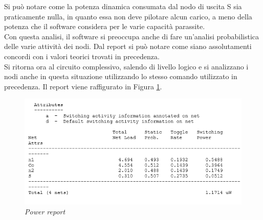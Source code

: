 Si può notare come la potenza dinamica consumata dal nodo di uscita S sia praticamente nulla, in quanto essa non deve pilotare alcun carico, a meno della potenza che il software considera per le varie capacità parassite. \\
Con questa analisi, il software si preoccupa anche di fare un'analisi probabilistica delle varie attività dei nodi. Dal report si può notare come siano assolutamenti concordi con i valori teorici trovati in precedenza.\\
Si ritorna ora al circuito complessivo, salendo di livello logico e si analizzano i nodi anche in questa situazione utilizzando lo stesso comando utilizzato in precedenza. Il report viene raffigurato in Figura \ref{verbose2}.
\begin{figure}[!htb]
	\centering
	\includegraphics[scale=0.6]{immagini/verbose1}
	\caption{\textit{Power report}}
	\label{verbose2}
\end{figure}

